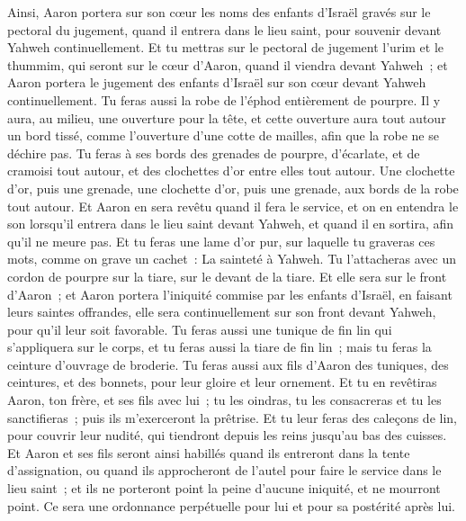 \begin{multicols}{2}
Ainsi, Aaron portera sur son cœur les noms des enfants d'Israël gravés sur le pectoral du jugement, quand il entrera dans le lieu saint, pour souvenir devant Yahweh continuellement.
Et tu mettras sur le pectoral de jugement l'urim et le thummim, qui seront sur le cœur d'Aaron, quand il viendra devant Yahweh~; et Aaron portera le jugement des enfants d'Israël sur son cœur devant Yahweh continuellement.
Tu feras aussi la robe de l'éphod entièrement de pourpre.
Il y aura, au milieu, une ouverture pour la tête, et cette ouverture aura tout autour un bord tissé, comme l'ouverture d'une cotte de mailles, afin que la robe ne se déchire pas.
Tu feras à ses bords des grenades de pourpre, d'écarlate, et de cramoisi tout autour, et des clochettes d'or entre elles tout autour.
Une clochette d'or, puis une grenade, une clochette d'or, puis une grenade, aux bords de la robe tout autour.
Et Aaron en sera revêtu quand il fera le service, et on en entendra le son lorsqu'il entrera dans le lieu saint devant Yahweh, et quand il en sortira, afin qu'il ne meure pas.
Et tu feras une lame d'or pur, sur laquelle tu graveras ces mots, comme on grave un cachet~: La sainteté à Yahweh.
Tu l'attacheras avec un cordon de pourpre sur la tiare, sur le devant de la tiare.
Et elle sera sur le front d'Aaron~; et Aaron portera l'iniquité commise par les enfants d'Israël, en faisant leurs saintes offrandes, elle sera continuellement sur son front devant Yahweh, pour qu'il leur soit favorable.
Tu feras aussi une tunique de fin lin qui s'appliquera sur le corps, et tu feras aussi la tiare de fin lin~; mais tu feras la ceinture d'ouvrage de broderie.
Tu feras aussi aux fils d'Aaron des tuniques, des ceintures, et des bonnets, pour leur gloire et leur ornement.
Et tu en revêtiras Aaron, ton frère, et ses fils avec lui~; tu les oindras, tu les consacreras et tu les sanctifieras~; puis ils m'exerceront la prêtrise.
Et tu leur feras des caleçons de lin, pour couvrir leur nudité, qui tiendront depuis les reins jusqu'au bas des cuisses.
Et Aaron et ses fils seront ainsi habillés quand ils entreront dans la tente d'assignation, ou quand ils approcheront de l'autel pour faire le service dans le lieu saint~; et ils ne porteront point la peine d'aucune iniquité, et ne mourront point. Ce sera une ordonnance perpétuelle pour lui et pour sa postérité après lui.

\end{multicols}
